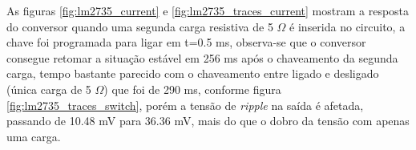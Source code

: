 \noindent
\begin{minipage}{\linewidth}
\label{fig:lm2735_traces_current}
\end{minipage}

As figuras \ref{fig:lm2735_current} e \ref{fig:lm2735_traces_current} mostram a resposta do conversor quando uma segunda carga resistiva de 5 $\Omega$ é inserida no circuito, a chave foi programada para ligar em t=0.5 ms, observa-se que o conversor consegue retomar a situação estável em 256 ms após o chaveamento da segunda carga, tempo bastante parecido com o chaveamento entre ligado e desligado (única carga de 5 $\Omega$) que foi de 290 ms, conforme figura \ref{fig:lm2735_traces_switch}, porém a tensão de \textit{ripple} na saída é afetada, passando de 10.48 mV para 36.36 mV, mais do que o dobro da tensão com apenas uma carga.




